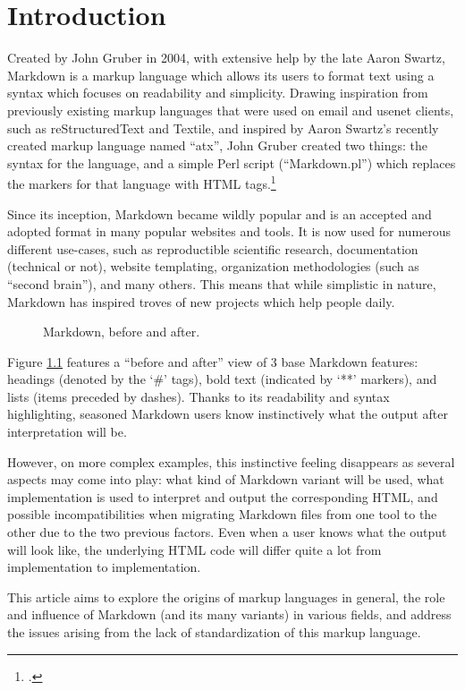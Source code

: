 \chapter{Introduction}
\label{chap:introduction}

\vspace{1cm}

Created by John Gruber in 2004, with extensive help by the late Aaron Swartz, Markdown is a markup language which allows its users to format
text using a syntax which focuses on readability and simplicity.
Drawing inspiration from previously existing markup languages that were used on email and usenet clients, such as reStructuredText and Textile,
and inspired by Aaron Swartz's recently created markup language named ``atx'', John Gruber created two things: the syntax for the language, and a simple
Perl script (``Markdown.pl'') which replaces the markers for that language with HTML tags.\footcite{gruber2004markdown}\newline

Since its inception, Markdown became wildly popular and is an accepted and adopted format in many popular websites and tools. It is now used for
numerous different use-cases, such as reproductible scientific research, documentation (technical or not), website templating, organization
methodologies (such as ``second brain''), and many others. This means that while simplistic in nature, Markdown has inspired troves of
new projects which help people daily.\newline

\begin{figure}[H]
    \hspace{-3cm}
    \qquad
    \caption{Markdown, before and after.}
    \label{fig:example-simple-syntax}
\end{figure}

Figure \ref{fig:example-simple-syntax} features a ``before and after'' view of 3 base Markdown features: headings (denoted by the `\#' tags),
bold text (indicated by `**' markers), and lists (items preceded by dashes). Thanks to its readability and syntax highlighting, seasoned
Markdown users know instinctively what the output after interpretation will be.\newline

However, on more complex examples, this instinctive feeling disappears as several aspects may come into play: what kind of Markdown variant will
be used, what implementation is used to interpret and output the corresponding HTML, and possible incompatibilities when migrating Markdown files
from one tool to the other due to the two previous factors. Even when a user knows what the output will look like, the underlying HTML code
will differ quite a lot from implementation to implementation.\newline

This article aims to explore the origins of markup languages in general, the role and influence of Markdown (and its many variants)
in various fields, and address the issues arising from the lack of standardization of this markup language.